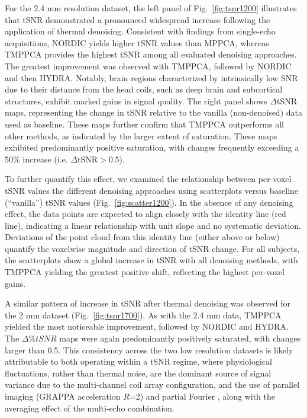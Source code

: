 For the 2.4 mm resolution dataset, the left panel of Fig.~\ref{fig:tsnr1200} illustrates that tSNR demonstrated a pronounced widespread increase following the application of thermal denoising. Consistent with findings from single-echo acquisitions, NORDIC yields higher tSNR values than MPPCA, whereas TMPPCA provides the highest tSNR among all evaluated denoising approaches. The greatest improvement was observed with TMPPCA, followed by NORDIC and then HYDRA. Notably, brain regions characterized by intrinsically low SNR due to their distance from the head coils, such as deep brain and subcortical structures, exhibit marked gains in signal quality.  The right panel shows $\Delta$tSNR maps, representing the change in tSNR relative to the vanilla (non-denoised) data used as baseline. These maps further confirm that TMPPCA outperforms all other methods, as indicated by the larger extent of saturation. These maps exhibited predominantly positive saturation, with changes frequently exceeding a 50\% increase (i.e. $\Delta \text{tSNR} > 0.5$).

To further quantify this effect, we examined the relationship between per-voxel tSNR values the different denoising approaches using scatterplots versus baseline (“vanilla”) tSNR values (Fig.~\ref{fig:scatter1200}). In the absence of any denoising effect, the data points are expected to align closely with the identity line (red line), indicating a linear relationship with unit slope and no systematic deviation. Deviations of the point cloud from this identity line (either above or below) quantify the voxelwise magnitude and direction of tSNR change. For all subjects, the scatterplots show a global increase in tSNR with all denoising methods, with TMPPCA yielding the greatest positive shift, reflecting the highest per‑voxel gains.

A similar pattern of increase in tSNR after thermal denoising was observed for the 2 mm dataset (Fig.~\ref{fig:tsnr1700}). As with the 2.4 mm data, TMPPCA yielded the most noticeable improvement, followed by NORDIC and HYDRA. The $\Delta\%tSNR$ maps were again predominantly positively saturated, with changes larger than 0.5. This consistency across the two low resolution datasets is likely attributable to both operating within a tSNR regime, where physiological fluctuations, rather than thermal noise, are the dominant source of signal variance due to the multi-channel coil array configuration, and the use of parallel imaging (GRAPPA acceleration $R$=2) and partial Fourier \citep{triantafyllouPhysiologicalNoiseSignaltonoise2011}, along with the averaging effect of the multi-echo combination.

